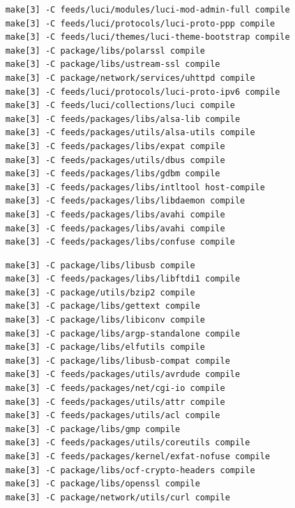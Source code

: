 \documentclass{beamer}
\begin{document}
\begin{frame}[fragile]
  \begin{lstlisting}
    make[3] -C feeds/luci/modules/luci-mod-admin-full compile
    make[3] -C feeds/luci/protocols/luci-proto-ppp compile
    make[3] -C feeds/luci/themes/luci-theme-bootstrap compile
    make[3] -C package/libs/polarssl compile
    make[3] -C package/libs/ustream-ssl compile
    make[3] -C package/network/services/uhttpd compile
    make[3] -C feeds/luci/protocols/luci-proto-ipv6 compile
    make[3] -C feeds/luci/collections/luci compile
    make[3] -C feeds/packages/libs/alsa-lib compile
    make[3] -C feeds/packages/utils/alsa-utils compile
    make[3] -C feeds/packages/libs/expat compile
    make[3] -C feeds/packages/utils/dbus compile
    make[3] -C feeds/packages/libs/gdbm compile
    make[3] -C feeds/packages/libs/intltool host-compile
    make[3] -C feeds/packages/libs/libdaemon compile
    make[3] -C feeds/packages/libs/avahi compile
    make[3] -C feeds/packages/libs/avahi compile
    make[3] -C feeds/packages/libs/confuse compile
  \end{lstlisting}
\end{frame}

\begin{frame}[fragile]
  \begin{lstlisting}
    make[3] -C package/libs/libusb compile
    make[3] -C feeds/packages/libs/libftdi1 compile
    make[3] -C package/utils/bzip2 compile
    make[3] -C package/libs/gettext compile
    make[3] -C package/libs/libiconv compile
    make[3] -C package/libs/argp-standalone compile
    make[3] -C package/libs/elfutils compile
    make[3] -C package/libs/libusb-compat compile
    make[3] -C feeds/packages/utils/avrdude compile
    make[3] -C feeds/packages/net/cgi-io compile
    make[3] -C feeds/packages/utils/attr compile
    make[3] -C feeds/packages/utils/acl compile
    make[3] -C package/libs/gmp compile
    make[3] -C feeds/packages/utils/coreutils compile
    make[3] -C feeds/packages/kernel/exfat-nofuse compile
    make[3] -C package/libs/ocf-crypto-headers compile
    make[3] -C package/libs/openssl compile
    make[3] -C package/network/utils/curl compile
  \end{lstlisting}
\end{frame}
\end{document}
